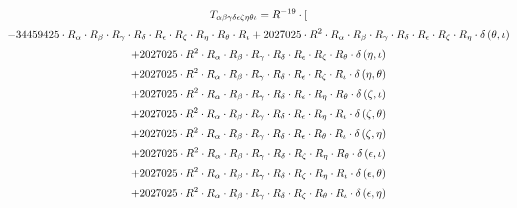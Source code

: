 \begin{subequations}\begin{gather}
T_{\alpha{}\beta{}\gamma{}\delta{}\epsilon{}\zeta{}\eta{}\theta{}\iota{}} = R^{-19} \cdot [ 
 \\[0.2em] \notag - 34459425 \cdot R_{\alpha{}} \cdot R_{\beta{}} \cdot R_{\gamma{}} \cdot R_{\delta{}} \cdot R_{\epsilon{}} \cdot R_{\zeta{}} \cdot R_{\eta{}} \cdot R_{\theta{}} \cdot R_{\iota{}}+ 2027025 \cdot R^{2} \cdot R_{\alpha{}} \cdot R_{\beta{}} \cdot R_{\gamma{}} \cdot R_{\delta{}} \cdot R_{\epsilon{}} \cdot R_{\zeta{}} \cdot R_{\eta{}} \cdot \delta{}\left(\theta{}, \iota{}\right) 
 \\[0.2em] \notag 		 + 2027025 \cdot R^{2} \cdot R_{\alpha{}} \cdot R_{\beta{}} \cdot R_{\gamma{}} \cdot R_{\delta{}} \cdot R_{\epsilon{}} \cdot R_{\zeta{}} \cdot R_{\theta{}} \cdot \delta{}\left(\eta{}, \iota{}\right) 
 \\[0.2em] \notag 		 + 2027025 \cdot R^{2} \cdot R_{\alpha{}} \cdot R_{\beta{}} \cdot R_{\gamma{}} \cdot R_{\delta{}} \cdot R_{\epsilon{}} \cdot R_{\zeta{}} \cdot R_{\iota{}} \cdot \delta{}\left(\eta{}, \theta{}\right) 
 \\[0.2em] \notag 		 + 2027025 \cdot R^{2} \cdot R_{\alpha{}} \cdot R_{\beta{}} \cdot R_{\gamma{}} \cdot R_{\delta{}} \cdot R_{\epsilon{}} \cdot R_{\eta{}} \cdot R_{\theta{}} \cdot \delta{}\left(\zeta{}, \iota{}\right) 
 \\[0.2em] \notag 		 + 2027025 \cdot R^{2} \cdot R_{\alpha{}} \cdot R_{\beta{}} \cdot R_{\gamma{}} \cdot R_{\delta{}} \cdot R_{\epsilon{}} \cdot R_{\eta{}} \cdot R_{\iota{}} \cdot \delta{}\left(\zeta{}, \theta{}\right) 
 \\[0.2em] \notag 		 + 2027025 \cdot R^{2} \cdot R_{\alpha{}} \cdot R_{\beta{}} \cdot R_{\gamma{}} \cdot R_{\delta{}} \cdot R_{\epsilon{}} \cdot R_{\theta{}} \cdot R_{\iota{}} \cdot \delta{}\left(\zeta{}, \eta{}\right) 
 \\[0.2em] \notag 		 + 2027025 \cdot R^{2} \cdot R_{\alpha{}} \cdot R_{\beta{}} \cdot R_{\gamma{}} \cdot R_{\delta{}} \cdot R_{\zeta{}} \cdot R_{\eta{}} \cdot R_{\theta{}} \cdot \delta{}\left(\epsilon{}, \iota{}\right) 
 \\[0.2em] \notag 		 + 2027025 \cdot R^{2} \cdot R_{\alpha{}} \cdot R_{\beta{}} \cdot R_{\gamma{}} \cdot R_{\delta{}} \cdot R_{\zeta{}} \cdot R_{\eta{}} \cdot R_{\iota{}} \cdot \delta{}\left(\epsilon{}, \theta{}\right) 
 \\[0.2em] \notag 		 + 2027025 \cdot R^{2} \cdot R_{\alpha{}} \cdot R_{\beta{}} \cdot R_{\gamma{}} \cdot R_{\delta{}} \cdot R_{\zeta{}} \cdot R_{\theta{}} \cdot R_{\iota{}} \cdot \delta{}\left(\epsilon{}, \eta{}\right) 

\end{gather}
\end{subequations}
